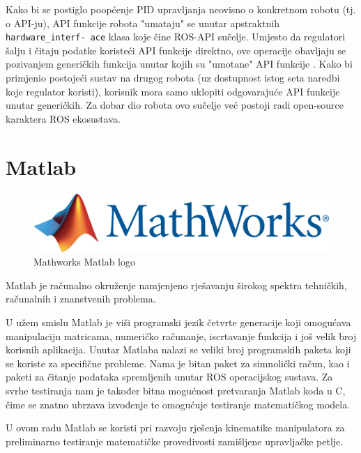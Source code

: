 \documentclass[times, utf8, diplomski, numeric]{fer}
\begin{document}
Kako bi se postiglo poopćenje PID upravljanja neovisno o konkretnom robotu (tj. o API-ju), API funkcije robota "umataju" se unutar apstraktnih \texttt{hardware\_interf- ace} klasa koje čine ROS-API sučelje.
Umjesto da regulatori šalju i čitaju podatke koristeći API funkcije direktno, ove operacije obavljaju se pozivanjem generičkih funkcija unutar kojih su "umotane" API funkcije .
Kako bi primjenio postojeći sustav na drugog robota (uz dostupnost istog seta naredbi koje regulator koristi), korisnik mora samo uklopiti odgovarajuće API funkcije unutar generičkih.
Za dobar dio robota ovo sučelje već postoji radi open-source karaktera ROS ekosustava.


\section{Matlab}
\begin{figure}[h!]
\centering
\includegraphics[scale=0.3]{logo_mathworks}
\caption{Mathworks Matlab logo}
\end{figure}
Matlab je računalno okruženje namjenjeno rješavanju širokog spektra tehničkih, računalnih i znanstvenih problema.

U užem smislu Matlab je viši programski jezik četvrte generacije koji omogućava manipulaciju matricama, numeričko računanje, iscrtavanje funkcija i još velik broj korisnih aplikacija.
Unutar Matlaba nalazi se veliki broj programskih paketa koji se koriste za specifične probleme.
Nama je bitan paket za simnolički račun, kao i paketi za čitanje podataka spremljenih unutar ROS operacijskog sustava.
Za svrhe testiranja nam je također bitna mogućnost pretvaranja Matlab koda u C, čime se znatno ubrzava izvođenje te omogućuje testiranje matematičkog modela.

U ovom radu Matlab se koristi pri razvoju rješenja kinematike manipulatora za preliminarno testiranje matematičke provedivosti zamišljene upravljačke petlje.
\end{document}
